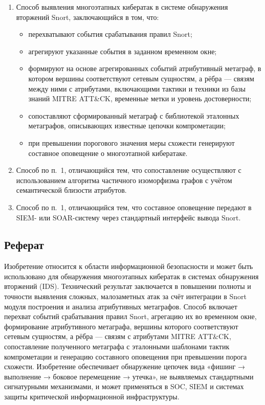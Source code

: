 \begin{enumerate}[label=\arabic*., leftmargin=*]
  \item Способ выявления многоэтапных кибератак в системе обнаружения вторжений Snort, заключающийся в том, что:
  \begin{itemize}
    \item перехватывают события срабатывания правил Snort;
    \item агрегируют указанные события в заданном временном окне;
    \item формируют на основе агрегированных событий атрибутивный метаграф, в котором вершины соответствуют сетевым сущностям, а рёбра — связям между ними с атрибутами, включающими тактики и техники из базы знаний MITRE ATT\&CK, временные метки и уровень достоверности;
    \item сопоставляют сформированный метаграф с библиотекой эталонных метаграфов, описывающих известные цепочки компрометации;
    \item при превышении порогового значения меры схожести генерируют составное оповещение о многоэтапной кибератаке.
  \end{itemize}

  \item Способ по п.~1, отличающийся тем, что сопоставление осуществляют с использованием алгоритма частичного изоморфизма графов с учётом семантической близости атрибутов.

  \item Способ по п.~1, отличающийся тем, что составное оповещение передают в SIEM- или SOAR-систему через стандартный интерфейс вывода Snort.
\end{enumerate}

\subsection{Реферат}

Изобретение относится к области информационной безопасности и может быть использовано для обнаружения многоэтапных кибератак в системах обнаружения вторжений (IDS). Технический результат заключается в повышении полноты и точности выявления сложных, малозаметных атак за счёт интеграции в Snort модуля построения и анализа атрибутивных метаграфов. Способ включает перехват событий срабатывания правил Snort, агрегацию их во временном окне, формирование атрибутивного метаграфа, вершины которого соответствуют сетевым сущностям, а рёбра — связям с атрибутами MITRE ATT\&CK, сопоставление полученного метаграфа с эталонными шаблонами тактик компрометации и генерацию составного оповещения при превышении порога схожести. Изобретение обеспечивает обнаружение цепочек вида «фишинг → выполнение → боковое перемещение → утечка», не выявляемых стандартными сигнатурными механизмами, и может применяться в SOC, SIEM и системах защиты критической информационной инфраструктуры.

